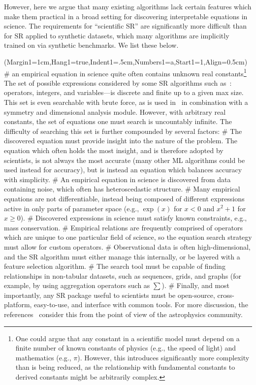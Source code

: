 \documentclass[letterpaper,twocolumn]{scrartcl}
\newcommand\we{we\xspace}
\newcommand\sr{SR\xspace}
\begin{document}
However, here \we argue that many existing algorithms lack certain features which make them practical in a broad setting for discovering interpretable equations in science.
The requirements for ``scientific \sr'' are significantly more difficult than for \sr applied to synthetic datasets, which many algorithms are implicitly trained on via synthetic benchmarks.
We list these below.

\begin{easylist}
\ListProperties(Margin1=1cm,Hang1=true,Indent1=.5cm,Numbers1=a,Start1=1,Align=0.5cm)
#
an empirical equation in science quite often contains unknown real constants\footnote{One could argue that any constant in a scientific model must depend on a finite number of known constants of physics (e.g., the speed of light) and mathematics (e.g., $\pi$). However, this introduces significantly more complexity than is being reduced, as the relationship with fundamental constants to derived constants might be arbitrarily complex.}
The set of possible expressions considered by some \sr algorithms such as~\cite{udrescuAIFeynmanParetooptimal2020}: operators, integers, and variables---is discrete and finite up to a given max size.
This set is even searchable with brute force, as is used in~\cite{udrescuAIFeynmanParetooptimal2020} in combination with a symmetry and dimensional analysis module.
However, with arbitrary real constants, the set of equations one must search is uncountably infinite.
The difficulty of searching this set is further compounded by several factors:
#
The discovered equation must provide insight into the nature of the problem.
The equation which often holds the most insight, and is therefore adopted by scientists, is not always the most accurate (many other ML algorithms could be used instead for accuracy), but is instead an equation which balances accuracy with simplicity.
#
An empirical equation in science is discovered from data containing noise, which often has heteroscedastic structure.
#
Many empirical equations are not differentiable, instead being composed of different expressions active in only parts of parameter space (e.g., $\exp(x)$ for $x<0$ and $x^2+1$ for $x\geq 0$).
#
Discovered expressions in science must satisfy known constraints, e.g., mass conservation.
#
Empirical relations are frequently comprised of operators which are unique to one particular field of science, so the equation search strategy must allow for custom operators.
#
Observational data is often high-dimensional, and the \sr algorithm must either manage this internally, or be layered with a feature selection algorithm.
#
The search tool must be capable of finding relationships in non-tabular datasets, such as sequences, grids, and graphs (for example, by using aggregation operators such as $\sum$). #
Finally, and most importantly, any \sr package useful to scientists must be open-source, cross-platform, easy-to-use, and interface with common tools.
For more discussion, the references~\cite{price-whelanAstropyProjectBuilding2018,astropycollaborationAstropyProjectSustaining2022} consider this from the point of view of the astrophysics community.
\end{easylist}
\end{document}
